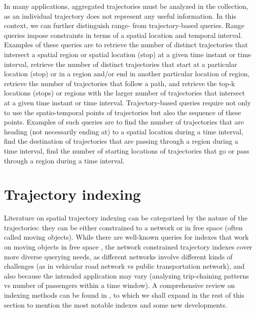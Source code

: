\documentclass[a4paper,10pt,twoside]{book}
\begin{document}
    In many applications, aggregated trajectories must be analyzed in the collection, as an individual trajectory does not represent any useful information.
    In this context, we can  further distinguish range- from trajectory-based queries. Range queries impose constraints in terms of a spatial location  and temporal interval.  Examples of these queries are  to retrieve the number of distinct trajectories  that intersect a spatial region or spatial location (stop) at a given time instant or time interval, retrieve the number of distinct trajectories that start at a particular location (stop) or in a region and/or end in another particular location of region, retrieve the number of trajectories that follow a path, 
     and retrieve the  top-k locations (stops) or regions  with the larger number of  trajectories that  intersect  at a given time instant or time interval. Trajectory-based queries require not only to use the spatio-temporal points of trajectories  but also the sequence of these points. Examples of such queries are  to find the number of trajectories that are heading (not necessarily ending at) to a spatial location during a time interval, find the destination of trajectories that are passing through a region during a time interval, find the number of starting locations of  trajectories that go or pass through a region during a time interval.
	
	\section{Trajectory indexing}
	\label{sec:ti}
	Literature on spatial trajectory indexing can be categorized by the nature of the trajectories: they can be either constrained to a network or in free space (often called moving objects). While there are well-known queries for indexes that work on moving objects in free space \cite{DBLP:conf/vldb/PfoserJT00}, the network constrained trajectory indexes cover more diverse querying needs, as different networks involve different kinds of challenges (as in vehicular road network vs public transportation network), and also because the intended application may vary (analyzing trip-chaining patterns vs number of passengers within a time window). A comprehensive review on indexing methods can be found in \cite[Chapter 4]{DBLP:books/sp/PelekisT14}, to which we shall expand in the rest of this section to mention the most notable indexes and some new developments.
	
\end{document}
